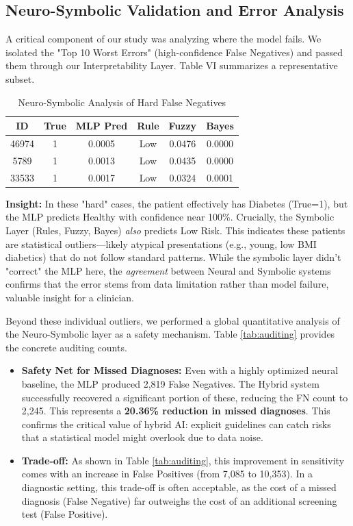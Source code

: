 \documentclass[conference]{IEEEtran}
\begin{document}
\subsection{Neuro-Symbolic Validation and Error Analysis}
 A critical component of our study was analyzing where the model fails. We isolated the "Top 10 Worst Errors" (high-confidence False Negatives) and passed them through our Interpretability Layer. Table VI summarizes a representative subset.

\begin{table}[htbp]
\caption{Neuro-Symbolic Analysis of Hard False Negatives}
\begin{center}
\begin{tabular}{|c|c|c|c|c|c|}
\hline
\textbf{ID} & \textbf{True} & \textbf{MLP Pred} & \textbf{Rule} & \textbf{Fuzzy} & \textbf{Bayes} \\
\hline
46974 & 1 & 0.0005 & Low & 0.0476 & 0.0000 \\
5789 & 1 & 0.0013 & Low & 0.0435 & 0.0000 \\
33533 & 1 & 0.0017 & Low & 0.0324 & 0.0001 \\
\hline
\end{tabular}
\label{tab:hard_examples}
\end{center}
\end{table}

\textbf{Insight:} In these "hard" cases, the patient effectively has Diabetes (True=1), but the MLP predicts Healthy with confidence near 100\%. Crucially, the Symbolic Layer (Rules, Fuzzy, Bayes) \textit{also} predicts Low Risk. This indicates these patients are statistical outliers—likely atypical presentations (e.g., young, low BMI diabetics) that do not follow standard patterns. While the symbolic layer didn't "correct" the MLP here, the \textit{agreement} between Neural and Symbolic systems confirms that the error stems from data limitation rather than model failure, valuable insight for a clinician.

Beyond these individual outliers, we performed a global quantitative analysis of the Neuro-Symbolic layer as a safety mechanism. Table \ref{tab:auditing} provides the concrete auditing counts.



\begin{itemize}
    \item \textbf{Safety Net for Missed Diagnoses:} Even with a highly optimized neural baseline, the MLP produced 2,819 False Negatives. The Hybrid system successfully recovered a significant portion of these, reducing the FN count to 2,245. This represents a \textbf{20.36\% reduction in missed diagnoses}. This confirms the critical value of hybrid AI: explicit guidelines can catch risks that a statistical model might overlook due to data noise.
    \item \textbf{Trade-off:} As shown in Table \ref{tab:auditing}, this improvement in sensitivity comes with an increase in False Positives (from 7,085 to 10,353). In a diagnostic setting, this trade-off is often acceptable, as the cost of a missed diagnosis (False Negative) far outweighs the cost of an additional screening test (False Positive).
\end{itemize}
\end{document}
